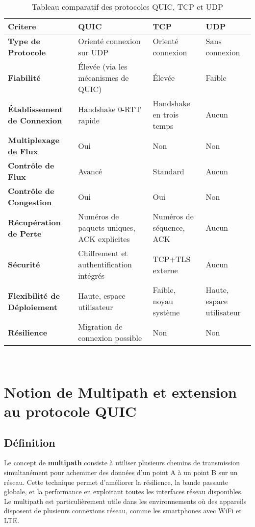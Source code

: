 \begin{table}[]
    \centering
    \begin{tabular}{| p{3cm} | p{5cm} | p{4cm} | p{3cm} |}
        \hline
        \textbf{Critere} & \textbf{QUIC} & \textbf{TCP} & \textbf{UDP} \\ \hline
        \textbf{Type de Protocole} & Orienté connexion sur UDP  & Orienté connexion & Sans connexion \\ \hline
        \textbf{Fiabilité} & Élevée (via les mécanismes de QUIC) & Élevée & Faible \\ \hline
        \textbf{Établissement de Connexion} & Handshake 0-RTT rapide & Handshake en trois temps & Aucun \\ \hline
        \textbf{Multiplexage de Flux} & Oui  & Non & Non \\ \hline
        \textbf{Contrôle de Flux} & Avancé  & Standard & Aucun \\ \hline
        \textbf{Contrôle de Congestion } & Oui  & Oui  & Non \\ \hline
        \textbf{Récupération de Perte} & Numéros de paquets uniques, ACK explicites & Numéros de séquence, ACK & Aucun \\ \hline
        \textbf{Sécurité} & Chiffrement et authentification intégrés  & TCP+TLS externe & Aucun \\ \hline
        \textbf{Flexibilité de Déploiement} & Haute, espace utilisateur & Faible, noyau système & Haute, espace utilisateur \\ \hline
        \textbf{Résilience} & Migration de connexion possible & Non & Non \\ \hline
    \end{tabular}\\
    \caption{Tableau comparatif des protocoles QUIC, TCP et UDP }
    \label{tab:Table_COMPARE_QTU}
\end{table}

\section{Notion de Multipath et extension au protocole QUIC}
\subsection{Définition}
Le concept de \textbf{multipath} consiste à utiliser plusieurs chemins de transmission simultanément pour acheminer des données d'un point A à un point B sur un réseau. Cette technique permet d'améliorer la résilience, la bande passante globale, et la performance en exploitant toutes les interfaces réseau disponibles. Le multipath est particulièrement utile dans les environnements où des appareils disposent de plusieurs connexions réseau, comme les smartphones avec WiFi et LTE.

